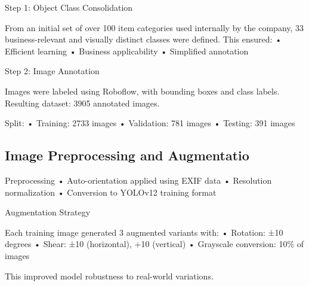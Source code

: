 \documentclass[a4paper,10pt,twocolumn]{article}
\numberwithin{figure}{section}
\numberwithin{table}{section}
\begin{document}





Step 1: Object Class Consolidation

From an initial set of over 100 item categories used internally by the company, 33 business-relevant and visually distinct classes were defined. This ensured:
	•	Efficient learning
	•	Business applicability
	•	Simplified annotation

    Step 2: Image Annotation

Images were labeled using Roboflow, with bounding boxes and class labels. Resulting dataset: 3905 annotated images.

Split:
	•	Training: 2733 images
	•	Validation: 781 images
	•	Testing: 391 images

\subsection{Image Preprocessing and Augmentatio}

Preprocessing
	•	Auto-orientation applied using EXIF data
	•	Resolution normalization
	•	Conversion to YOLOv12 training format

Augmentation Strategy

Each training image generated 3 augmented variants with:
	•	Rotation: ±10 degrees
	•	Shear: ±10 (horizontal), +10 (vertical)
	•	Grayscale conversion: 10\% of images

This improved model robustness to real-world variations.
\end{document}
